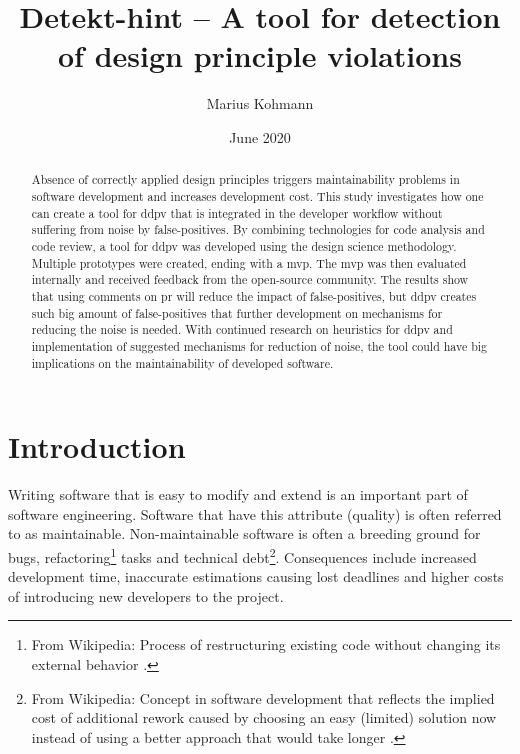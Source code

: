 \documentclass{report}
\title{Detekt-hint -- A tool for detection of design principle violations}
\author{Marius Kohmann}
\date{June 2020}
\begin{document}
\maketitle

\begin{abstract}
	Absence of correctly applied design principles triggers maintainability problems in software development and increases development cost. This study investigates how one can create a tool for \gls{ddpv} that is integrated in the developer workflow without suffering from noise by false-positives. By combining technologies for code analysis and code review, a tool for \gls{ddpv} was developed using the design science methodology. Multiple prototypes were created, ending with a \gls{mvp}. The \gls{mvp} was then evaluated internally and received feedback from the open-source community. The results show that using comments on \gls{pr} will reduce the impact of false-positives, but \gls{ddpv} creates such big amount of false-positives that further development on mechanisms for reducing the noise is needed. With continued research on heuristics for \gls{ddpv} and implementation of suggested mechanisms for reduction of noise, the tool could have big implications on the maintainability of developed software. 
	
\end{abstract}


\clearpage
\tableofcontents
\clearpage
\chapter{Introduction}




Writing software that is easy to modify and extend is an important part of software engineering. Software that have this attribute (quality) is often referred to as maintainable. Non-maintainable software is often a breeding ground for bugs, refactoring\footnote{From Wikipedia: Process of restructuring existing code without changing its external behavior \cite{refactoring}.} tasks and technical debt\footnote{From Wikipedia: Concept in software development that reflects the implied cost of additional rework caused by choosing an easy (limited) solution now instead of using a better approach that would take longer \cite{technicalDebt}.}. Consequences include increased development time, inaccurate estimations causing lost deadlines and higher costs of introducing new developers to the project.
\end{document}
